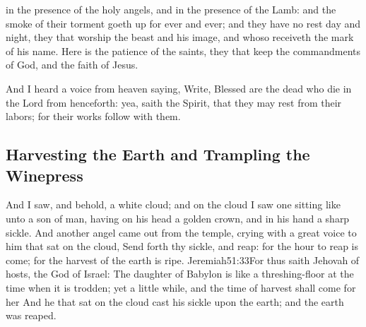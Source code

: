  in the presence of the holy angels, and in the presence of the Lamb: 
 and the smoke of their torment goeth up for ever and ever;%
 and they have no rest day and night,%
 they that worship the beast and his image, and whoso receiveth the mark of his name. 
 Here is the patience of the saints, they that keep the commandments of God, and the faith of Jesus.

 And I heard a voice from heaven saying, Write, Blessed are the dead who die in the Lord from henceforth: yea, saith the Spirit, that they may rest from their labors; for their works follow with them.
\subsection*{Harvesting the Earth and Trampling the Winepress}
 And I saw, and behold, a white cloud; and on the cloud I saw one sitting like unto a son of man,%
 having on his head a golden crown, and in his hand a sharp sickle. 
 And another angel came out from the temple, crying with a great voice to him that sat on the cloud, Send forth thy sickle, and reap: for the hour to reap is come; for the harvest of the earth is ripe.%
				  {Jeremiah}{51:33}{For thus saith Jehovah of hosts, the God of Israel: The daughter of Babylon is like a threshing-floor at the time when it is trodden; yet a little while, and the time of harvest shall come for her}
 And he that sat on the cloud cast his sickle upon the earth; and the earth was reaped.

